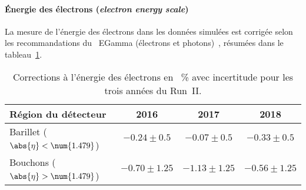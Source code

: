 \paragraph{Énergie des électrons (\emph{electron energy scale})}
La mesure de l'énergie des électrons dans les données simulées est corrigée selon les recommandations du \POG\ EGamma (électrons et photons)~\cite{EGammaPOG}, résumées dans le tableau~\ref{tab-chapter-HTT_analysis-section-corrections-eleES}.
\begin{table}[h]
\centering
\begin{tabular}{lccc}
\toprule
Région du détecteur & 2016 & 2017 & 2018\\
\midrule
Barillet ($\abs{\eta}<\num{1.479}$) & $\num{-0.24}\pm\num{0.5}$ & $\num{-0.07}\pm\num{0.5}$ & $\num{-0.33}\pm\num{0.5}$ \\
Bouchons ($\abs{\eta}>\num{1.479}$) & $\num{-0.70}\pm\num{1.25}$ & $\num{-1.13}\pm\num{1.25}$ & $\num{-0.56}\pm\num{1.25}$ \\
\bottomrule
\end{tabular}
\caption[Corrections à l'énergie des électrons.]{Corrections à l'énergie des électrons en \SI{}{\%} avec incertitude pour les trois années du Run~II.}
\label{tab-chapter-HTT_analysis-section-corrections-eleES}
\end{table}